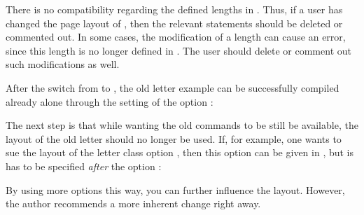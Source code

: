There is no compatibility regarding the defined lengths in
. Thus, if a user has changed the page layout of
, then the relevant statements should be deleted or
commented out. In some cases, the modification of a length can cause
an error, since this length is no longer defined in .
The user should delete or comment out such modifications as well.

After the switch from  to , the old
letter example can be successfully compiled already alone through the
setting of the option :

The next step is that while wanting the old commands to be still be
available, the layout of the old letter should no longer be used. If,
for example, one wants to sue the layout of the letter class option
, then this option can be given in ,
but is has to be specified \emph{after} the option :

By using more options this way, you can further influence the
layout. However, the author recommends a more inherent change right
away.

